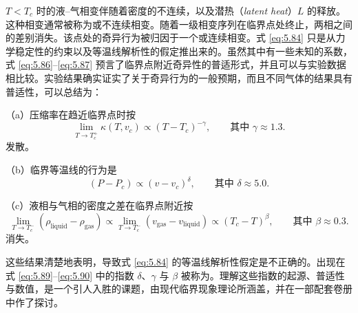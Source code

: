 
$T<T_c$ 时的液--气相变伴随着密度的不连续，以及潜热（\textit{latent heat}）$L$ 的释放。这种相变通常被称为或不连续相变。随着一级相变序列在临界点处终止，两相之间的差别消失。该点处的奇异行为被归因于一个或连续相变。式 \eqref{eq:5.84} 只是从力学稳定性的约束以及等温线解析性的假定推出来的。虽然其中有一些未知的系数，式 \eqref{eq:5.86}--\eqref{eq:5.87} 预言了临界点附近奇异性的普适形式，并且可以与实验数据相比较。实验结果确实证实了关于奇异行为的一般预期，而且不同气体的结果具有普适性，可以总结为：

（a）压缩率在趋近临界点时按
\begin{equation}\label{eq:5.88}
\lim_{T\to T_c^+}\kappa(T,v_c)\propto(T-T_c)^{-\gamma},\qquad\text{其中 }\gamma\approx1.3.
\end{equation}
发散。

（b）临界等温线的行为是
\begin{equation}\label{eq:5.89}
(P-P_c)\propto(v-v_c)^\delta,\qquad\text{其中 }\delta\approx5.0.
\end{equation}

（c）液相与气相的密度之差在临界点附近按
\begin{equation}\label{eq:5.90}
\lim_{T\to T_c^-}(\rho_{\text{liquid}}-\rho_{\text{gas}})\propto\lim_{T\to T_c^-}(v_{\text{gas}}-v_{\text{liquid}})\propto(T_c-T)^\beta,\qquad\text{其中 }\beta\approx0.3.
\end{equation}
消失。

这些结果清楚地表明，导致式 \eqref{eq:5.84} 的等温线解析性假定是不正确的。出现在式 \eqref{eq:5.89}--\eqref{eq:5.90} 中的指数 $\delta$、$\gamma$ 与 $\beta$ 被称为。理解这些指数的起源、普适性与数值，是一个引人入胜的课题，由现代临界现象理论所涵盖，并在一部配套卷册中作了探讨。

